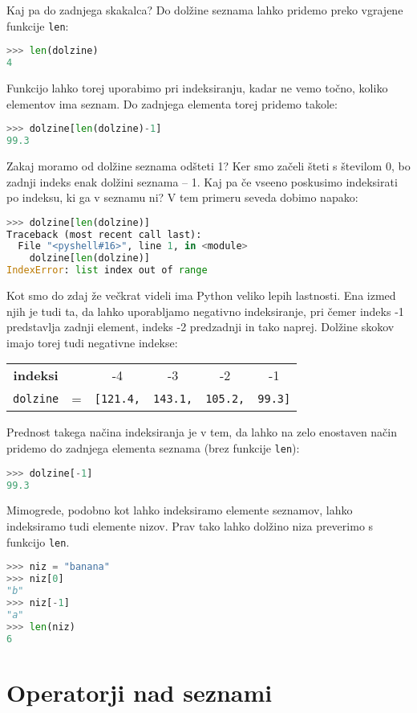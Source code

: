 Kaj pa do zadnjega skakalca? Do dolžine seznama lahko pridemo preko vgrajene funkcije \texttt{len}:
\begin{lstlisting}[language=Python]
>>> len(dolzine)
4
\end{lstlisting}
Funkcijo lahko torej uporabimo pri indeksiranju, kadar ne vemo točno, koliko elementov ima seznam. Do zadnjega elementa torej pridemo takole:
\begin{lstlisting}[language=Python]
>>> dolzine[len(dolzine)-1]
99.3
\end{lstlisting}
Zakaj moramo od dolžine seznama odšteti 1? Ker smo začeli šteti s številom 0, bo zadnji indeks enak dolžini seznama -- 1. Kaj pa če vseeno poskusimo indeksirati po indeksu, ki ga v seznamu ni? V tem primeru seveda dobimo napako:
\begin{lstlisting}[language=Python]
>>> dolzine[len(dolzine)]
Traceback (most recent call last):
  File "<pyshell#16>", line 1, in <module>
    dolzine[len(dolzine)]
IndexError: list index out of range
\end{lstlisting}
Kot smo do zdaj že večkrat videli ima Python veliko lepih lastnosti. Ena izmed njih je tudi ta, da lahko uporabljamo negativno indeksiranje, pri čemer indeks -1 predstavlja zadnji element, indeks -2 predzadnji in tako naprej. Dolžine skokov imajo torej tudi negativne indekse:

\begin{tabular}{cccccc}
\textbf{indeksi} & & -4 & -3 & -2 & -1\\
\texttt{dolzine} & = & \texttt{[121.4,}& \texttt{143.1,} & \texttt{105.2,} & \texttt{99.3]}
\end{tabular}

Prednost takega načina indeksiranja je v tem, da lahko na zelo enostaven način pridemo do zadnjega elementa seznama (brez funkcije \texttt{len}):
\begin{lstlisting}[language=Python]
>>> dolzine[-1]
99.3
\end{lstlisting}

Mimogrede, podobno kot lahko indeksiramo elemente seznamov, lahko indeksiramo tudi elemente nizov. Prav tako lahko dolžino niza preverimo s funkcijo \texttt{len}.
\begin{lstlisting}[language=Python]
>>> niz = "banana"
>>> niz[0]
"b"
>>> niz[-1]
"a"
>>> len(niz)
6
\end{lstlisting}

\section{Operatorji nad seznami}

